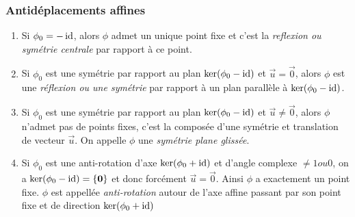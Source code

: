 \subsubsection{Antidéplacements affines}
\begin{enumerate}
	\item Si $\phi_0 = -\operatorname{id}$, alors $\phi$ admet un unique point fixe et c'est
		la \emph{reflexion ou symétrie centrale} par rapport à ce point.
	\item Si $\phi_0$ est une symétrie par rapport au plan $\ker(\phi_0 - \operatorname{id})$
		et $\vec{u} = \vec{0}$, alors $\phi$ est une \emph{réflexion ou une
		symétrie} par rapport à un plan parallèle à $\ker(\phi_0 - \operatorname{id})$.
	\item Si $\phi_0$ est une symétrie par rapport au plan $\ker(\phi_0 - \operatorname{id})$
		et $\vec{u} \neq \vec{0}$, alors $\phi$ n'admet pas de points fixes, 
		c'est la composée d'une symétrie et translation de vecteur $\vec{u}$. On
		appelle $\phi$ une \emph{symétrie plane glissée}.
	\item Si $\phi_0$ est une anti-rotation d'axe $\ker(\phi_0 + \operatorname{id})$ et
		d'angle complexe $\neq 1 ou 0$, on a $\ker(\phi_0 - \operatorname{id}) = \{\mathbf{0}\}$
		et donc forcément $\vec{u} = \vec{0}$. Ainsi $\phi$ a exactement un point
		fixe. $\phi$ est appellée \emph{anti-rotation} autour de l'axe affine
		passant par son point fixe et de direction $\ker(\phi_0 + \operatorname{id})$
\end{enumerate}
